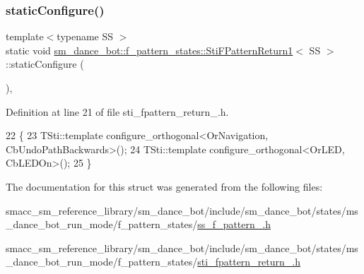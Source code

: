 \subsubsection{\texorpdfstring{static\+Configure()}{staticConfigure()}}
{\footnotesize\ttfamily template$<$typename SS $>$ \\
static void \hyperlink{classsm__dance__bot_1_1f__pattern__states_1_1StiFPatternReturn1}{sm\+\_\+dance\+\_\+bot\+::f\+\_\+pattern\+\_\+states\+::\+Sti\+F\+Pattern\+Return1}$<$ SS $>$\+::static\+Configure (\begin{DoxyParamCaption}{ }\end{DoxyParamCaption})\hspace{0.3cm}{\ttfamily [inline]}, {\ttfamily [static]}}



Definition at line 21 of file sti\+\_\+fpattern\+\_\+return\+\_.\+h.


\begin{DoxyCode}
22   \{
23     TSti::template configure\_orthogonal<OrNavigation, CbUndoPathBackwards>();
24     TSti::template configure\_orthogonal<OrLED, CbLEDOn>();
25   \}
\end{DoxyCode}


The documentation for this struct was generated from the following files\+:\begin{DoxyCompactItemize}
\item 
smacc\+\_\+sm\+\_\+reference\+\_\+library/sm\+\_\+dance\+\_\+bot/include/sm\+\_\+dance\+\_\+bot/states/ms\+\_\+dance\+\_\+bot\+\_\+run\+\_\+mode/f\+\_\+pattern\+\_\+states/\hyperlink{include_2sm__dance__bot_2states_2ms__dance__bot__run__mode_2f__pattern__states_2ss__f__pattern__1_8h}{ss\+\_\+f\+\_\+pattern\+\_.\+h}\item 
smacc\+\_\+sm\+\_\+reference\+\_\+library/sm\+\_\+dance\+\_\+bot/include/sm\+\_\+dance\+\_\+bot/states/ms\+\_\+dance\+\_\+bot\+\_\+run\+\_\+mode/f\+\_\+pattern\+\_\+states/\hyperlink{include_2sm__dance__bot_2states_2ms__dance__bot__run__mode_2f__pattern__states_2sti__fpattern__return__1_8h}{sti\+\_\+fpattern\+\_\+return\+\_.\+h}\end{DoxyCompactItemize}
